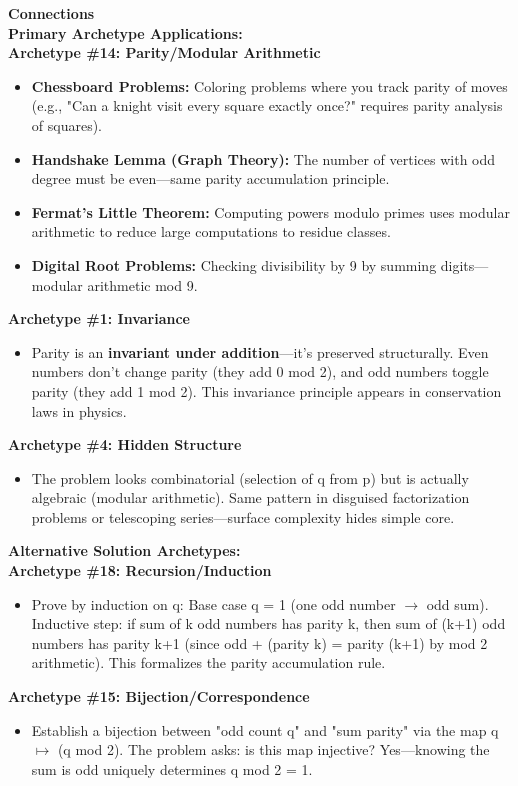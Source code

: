 \documentclass{article}
\begin{document}
\noindent \textbf{Connections} \\
\textbf{Primary Archetype Applications:} \\
\textbf{Archetype \#14: Parity/Modular Arithmetic}
\begin{itemize}
    \item \textbf{Chessboard Problems:} Coloring problems where you track parity of moves (e.g., "Can a knight visit every square exactly once?" requires parity analysis of squares).
    \item \textbf{Handshake Lemma (Graph Theory):} The number of vertices with odd degree must be even—same parity accumulation principle.
    \item \textbf{Fermat's Little Theorem:} Computing powers modulo primes uses modular arithmetic to reduce large computations to residue classes.
    \item \textbf{Digital Root Problems:} Checking divisibility by 9 by summing digits—modular arithmetic mod 9.
\end{itemize}
\textbf{Archetype \#1: Invariance}
\begin{itemize}
    \item Parity is an \textbf{invariant under addition}—it's preserved structurally. Even numbers don't change parity (they add 0 mod 2), and odd numbers toggle parity (they add 1 mod 2). This invariance principle appears in conservation laws in physics.
\end{itemize}
\textbf{Archetype \#4: Hidden Structure}
\begin{itemize}
    \item The problem looks combinatorial (selection of q from p) but is actually algebraic (modular arithmetic). Same pattern in disguised factorization problems or telescoping series—surface complexity hides simple core.
\end{itemize}
\textbf{Alternative Solution Archetypes:} \\
\textbf{Archetype \#18: Recursion/Induction}
\begin{itemize}
    \item Prove by induction on q: Base case q = 1 (one odd number $\to$ odd sum). Inductive step: if sum of k odd numbers has parity k, then sum of (k+1) odd numbers has parity k+1 (since odd + (parity k) = parity (k+1) by mod 2 arithmetic). This formalizes the parity accumulation rule.
\end{itemize}
\textbf{Archetype \#15: Bijection/Correspondence}
\begin{itemize}
    \item Establish a bijection between "odd count q" and "sum parity" via the map q $\mapsto$ (q mod 2). The problem asks: is this map injective? Yes—knowing the sum is odd uniquely determines q mod 2 = 1.
\end{itemize}
\end{document}
